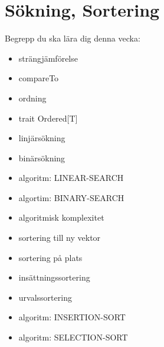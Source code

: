 \chapter{Sökning, Sortering}\label{chapter:W10}
Begrepp du ska lära dig denna vecka:
\begin{itemize}[noitemsep,label={$\square$},leftmargin=*]
\item strängjämförelse
\item compareTo
\item ordning
\item trait Ordered[T]
\item linjärsökning
\item binärsökning
\item algoritm: LINEAR-SEARCH
\item algortim: BINARY-SEARCH
\item algoritmisk komplexitet
\item sortering till ny vektor
\item sortering på plats
\item insättningssortering
\item urvalssortering
\item algoritm: INSERTION-SORT
\item algoritm: SELECTION-SORT\end{itemize}

